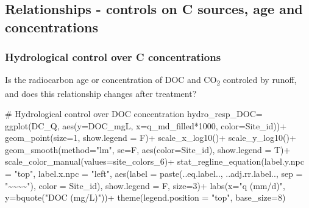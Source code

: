 \documentclass[
  letterpaper,
  DIV=11,
  numbers=noendperiod]{scrartcl}
\newenvironment{Shaded}{\begin{snugshade}}{\end{snugshade}}
\newcommand{\AttributeTok}[1]{\textcolor[rgb]{0.40,0.45,0.13}{#1}}
\newcommand{\CommentTok}[1]{\textcolor[rgb]{0.37,0.37,0.37}{#1}}
\newcommand{\DecValTok}[1]{\textcolor[rgb]{0.68,0.00,0.00}{#1}}
\newcommand{\FunctionTok}[1]{\textcolor[rgb]{0.28,0.35,0.67}{#1}}
\newcommand{\NormalTok}[1]{\textcolor[rgb]{0.00,0.23,0.31}{#1}}
\newcommand{\OtherTok}[1]{\textcolor[rgb]{0.00,0.23,0.31}{#1}}
\newcommand{\SpecialCharTok}[1]{\textcolor[rgb]{0.37,0.37,0.37}{#1}}
\newcommand{\StringTok}[1]{\textcolor[rgb]{0.13,0.47,0.30}{#1}}
\begin{document}
\subsection{Relationships - controls on C sources, age and
concentrations}\label{relationships---controls-on-c-sources-age-and-concentrations}

\subsubsection{Hydrological control over C
concentrations}\label{hydrological-control-over-c-concentrations}

Is the radiocarbon age or concentration of DOC and CO\textsubscript{2}
controled by runoff, and does this relationship changes after treatment?

\begin{Shaded}
\begin{Highlighting}[]
\CommentTok{\# Hydrological control over  DOC concentration}
\NormalTok{hydro\_resp\_DOC}\OtherTok{=}
  \FunctionTok{ggplot}\NormalTok{(DC\_Q,}
       \FunctionTok{aes}\NormalTok{(}\AttributeTok{y=}\NormalTok{DOC\_mgL, }\AttributeTok{x=}\NormalTok{q\_md\_filled}\SpecialCharTok{*}\DecValTok{1000}\NormalTok{, }\AttributeTok{color=}\NormalTok{Site\_id))}\SpecialCharTok{+} 
  \FunctionTok{geom\_point}\NormalTok{(}\AttributeTok{size=}\DecValTok{1}\NormalTok{, }\AttributeTok{show.legend =}\NormalTok{ F)}\SpecialCharTok{+}
  \FunctionTok{scale\_x\_log10}\NormalTok{()}\SpecialCharTok{+}
  \FunctionTok{scale\_y\_log10}\NormalTok{()}\SpecialCharTok{+}
  \FunctionTok{geom\_smooth}\NormalTok{(}\AttributeTok{method=}\StringTok{"lm"}\NormalTok{, }\AttributeTok{se=}\NormalTok{F, }\FunctionTok{aes}\NormalTok{(}\AttributeTok{color=}\NormalTok{Site\_id), }\AttributeTok{show.legend =}\NormalTok{ T)}\SpecialCharTok{+}
  \FunctionTok{scale\_color\_manual}\NormalTok{(}\AttributeTok{values=}\NormalTok{site\_colors\_6)}\SpecialCharTok{+}
  \FunctionTok{stat\_regline\_equation}\NormalTok{(}\AttributeTok{label.y.npc =} \StringTok{"top"}\NormalTok{, }\AttributeTok{label.x.npc =} \StringTok{"left"}\NormalTok{,}
  \FunctionTok{aes}\NormalTok{(}\AttributeTok{label =}  \FunctionTok{paste}\NormalTok{(..eq.label.., ..adj.rr.label.., }
                     \AttributeTok{sep =} \StringTok{"\textasciitilde{}\textasciitilde{}\textasciitilde{}\textasciitilde{}"}\NormalTok{), }\AttributeTok{color =}\NormalTok{ Site\_id), }
                      \AttributeTok{show.legend =}\NormalTok{ F, }\AttributeTok{size=}\DecValTok{3}\NormalTok{)}\SpecialCharTok{+}
  \FunctionTok{labs}\NormalTok{(}\AttributeTok{x=}\StringTok{"q (mm/d)"}\NormalTok{, }
       \AttributeTok{y=}\FunctionTok{bquote}\NormalTok{(}\StringTok{"DOC (mg/L)"}\NormalTok{))}\SpecialCharTok{+}
  \FunctionTok{theme}\NormalTok{(}\AttributeTok{legend.position =} \StringTok{"top"}\NormalTok{, }\AttributeTok{base\_size=}\DecValTok{8}\NormalTok{)}





\end{Highlighting}
\end{Shaded}
\end{document}
